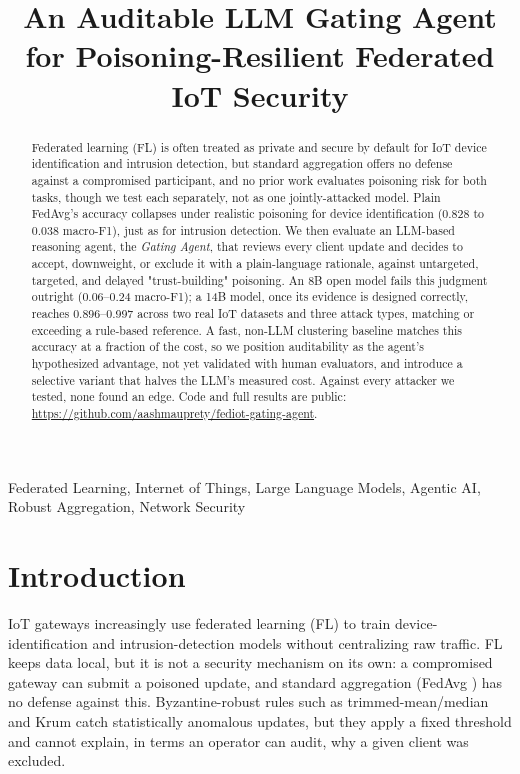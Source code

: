 \documentclass[conference]{IEEEtran}
\begin{document}
\title{An Auditable LLM Gating Agent for Poisoning-Resilient Federated IoT Security}

\author{
}

\maketitle

\begin{abstract}
Federated learning (FL) is often treated as private and secure by default for IoT device identification and intrusion detection, but standard aggregation offers no defense against a compromised participant, and no prior work evaluates poisoning risk for both tasks, though we test each separately, not as one jointly-attacked model. Plain FedAvg's accuracy collapses under realistic poisoning for device identification (0.828 to 0.038 macro-F1), just as for intrusion detection. We then evaluate an LLM-based reasoning agent, the \emph{Gating Agent}, that reviews every client update and decides to accept, downweight, or exclude it with a plain-language rationale, against untargeted, targeted, and delayed "trust-building" poisoning. An 8B open model fails this judgment outright (0.06--0.24 macro-F1); a 14B model, once its evidence is designed correctly, reaches 0.896--0.997 across two real IoT datasets and three attack types, matching or exceeding a rule-based reference. A fast, non-LLM clustering baseline matches this accuracy at a fraction of the cost, so we position auditability as the agent's hypothesized advantage, not yet validated with human evaluators, and introduce a selective variant that halves the LLM's measured cost. Against every attacker we tested, none found an edge. Code and full results are public: \url{https://github.com/aashmauprety/fediot-gating-agent}.
\end{abstract}

\begin{IEEEkeywords}
Federated Learning, Internet of Things, Large Language Models, Agentic AI, Robust Aggregation, Network Security
\end{IEEEkeywords}

\section{Introduction}
IoT gateways increasingly use federated learning (FL) to train device-identification and intrusion-detection models without centralizing raw traffic. FL keeps data local, but it is not a security mechanism on its own: a compromised gateway can submit a poisoned update, and standard aggregation (FedAvg \cite{mcmahan2017communication}) has no defense against this. Byzantine-robust rules such as trimmed-mean/median \cite{yin2018byzantine} and Krum \cite{blanchard2017machine} catch statistically anomalous updates, but they apply a fixed threshold and cannot explain, in terms an operator can audit, why a given client was excluded.
\end{document}

